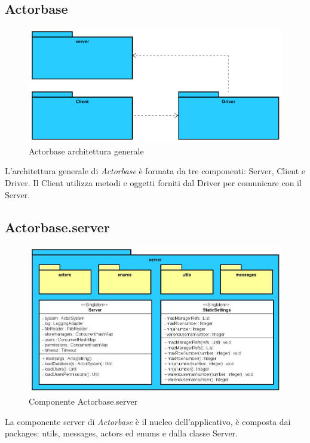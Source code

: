 \documentclass[a4paper]{article}
\begin{document}
	\subsection{Actorbase}
		\begin{figure}[H]
			\centering
			\includegraphics[width=\textwidth]{generalLevel.png}
			\caption{Actorbase architettura generale}
		\end{figure}
		L'architettura generale di \emph{Actorbase} è formata da tre componenti: Server, Client e Driver. 
		Il Client utilizza metodi e oggetti forniti dal Driver per comunicare con il Server.
		
	\subsection{Actorbase.server}
		\begin{figure}[H]
			\centering
			\includegraphics[scale=0.5]{Server/serverLevel.jpg}
			\caption{Componente Actorbase.server}
		\end{figure}
		La componente server di \emph{Actorbase} è il nucleo dell'applicativo, è composta dai packages: utils, messages, actors ed enums e dalla classe Server.
		
\end{document}
